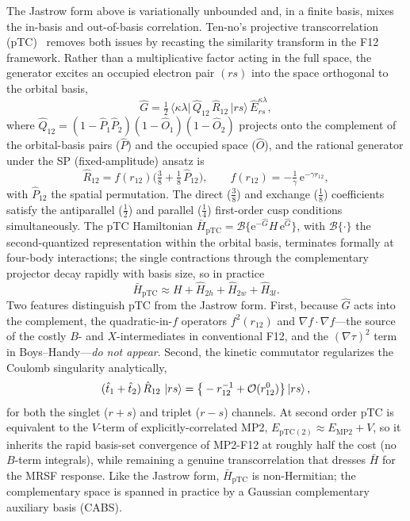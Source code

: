 \documentclass[aps,prb,reprint,superscriptaddress,floatfix]{revtex4-2}
\newcommand{\Hbar}{\bar{H}}
\newcommand{\op}[1]{\hat{#1}}
\newcommand{\ee}{\mathrm{e}}
\begin{document}
The Jastrow form above is variationally unbounded and, in a finite basis, mixes
the in-basis and out-of-basis correlation. Ten-no's projective transcorrelation
(pTC)~\cite{tenno2023} removes both issues by recasting the similarity transform in
the F12 framework. Rather than a multiplicative factor acting in the full space,
the generator excites an occupied electron pair $(rs)$ into the space orthogonal
to the orbital basis,
\begin{equation}
\op{G}=\tfrac12\,\big\langle\kappa\lambda\big|\,\op{Q}_{12}\,\op{R}_{12}\,\big|rs\big\rangle\,
\op{E}^{\kappa\lambda}_{rs},
\label{eq:gen}
\end{equation}
where $\op{Q}_{12}=(1-\op{P}_1\op{P}_2)(1-\op{O}_1)(1-\op{O}_2)$ projects onto the
complement of the orbital-basis pairs ($\op{P}$) and the occupied space ($\op{O}$),
and the rational generator under the SP (fixed-amplitude) ansatz is
\begin{equation}
\op{R}_{12}=f(r_{12})\Big(\tfrac38+\tfrac18\,\op{P}_{12}\Big),\qquad
f(r_{12})=-\tfrac1\gamma\,\ee^{-\gamma r_{12}},
\label{eq:sp}
\end{equation}
with $\op{P}_{12}$ the spatial permutation. The direct ($\tfrac38$) and exchange
($\tfrac18$) coefficients satisfy the antiparallel ($\tfrac12$) and parallel
($\tfrac14$) first-order cusp conditions simultaneously. The pTC Hamiltonian
$\Hbar_{\mathrm{pTC}}=\mathcal{B}\{\ee^{-\op{G}}H\,\ee^{\op{G}}\}$, with
$\mathcal{B}\{\cdot\}$ the second-quantized representation within the orbital basis,
terminates formally at four-body interactions; the single contractions through the
complementary projector decay rapidly with basis size, so in practice
\begin{equation}
\Hbar_{\mathrm{pTC}}\approx H+\op{H}_{2h}+\op{H}_{2w}+\op{H}_{3l}.
\label{eq:hptc}
\end{equation}
Two features distinguish pTC from the Jastrow form. First, because $\op{G}$ acts
into the complement, the quadratic-in-$f$ operators $f^2(r_{12})$ and
$\nabla f\!\cdot\!\nabla f$---the source of the costly $B$- and $X$-intermediates in
conventional F12, and the $(\nabla\tau)^2$ term in Boys--Handy---\emph{do not
appear}. Second, the kinetic commutator regularizes the Coulomb singularity
analytically,
\begin{equation}
(\op{t}_1+\op{t}_2)\,\op{R}_{12}\,\ket{rs}=\big\{-r_{12}^{-1}+\mathcal{O}(r_{12}^0)\big\}\ket{rs},
\label{eq:reg}
\end{equation}
for both the singlet ($r{+}s$) and triplet ($r{-}s$) channels. At second order pTC
is equivalent to the $V$-term of explicitly-correlated MP2,
$E_{\mathrm{pTC}(2)}\approx E_{\mathrm{MP2}}+V$, so it inherits the rapid
basis-set convergence of MP2-F12 at roughly half the cost (no $B$-term integrals),
while remaining a genuine transcorrelation that dresses $\Hbar$ for the MRSF
response. Like the Jastrow form, $\Hbar_{\mathrm{pTC}}$ is non-Hermitian; the
complementary space is spanned in practice by a Gaussian complementary auxiliary
basis (CABS).
\end{document}
